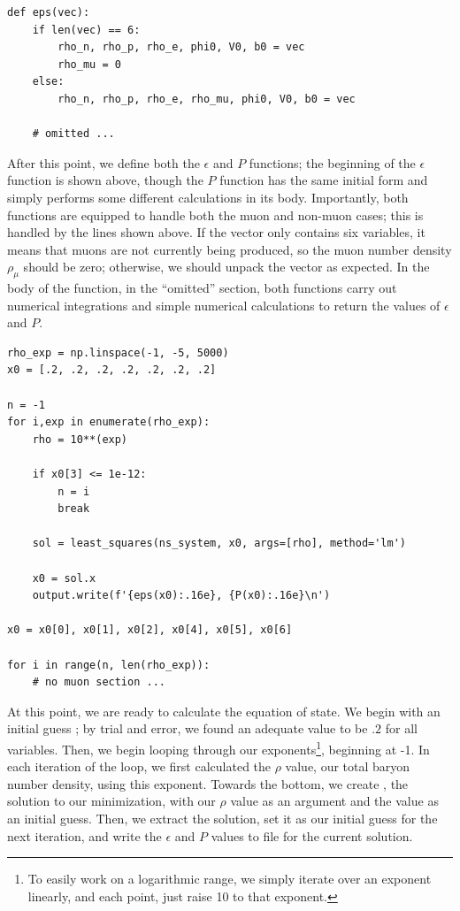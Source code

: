 \begin{lstlisting}
def eps(vec):
    if len(vec) == 6:
        rho_n, rho_p, rho_e, phi0, V0, b0 = vec
        rho_mu = 0
    else:
        rho_n, rho_p, rho_e, rho_mu, phi0, V0, b0 = vec
    
    # omitted ...
\end{lstlisting}

After this point, we define both the $\epsilon$ and $P$ functions; the beginning of the $\epsilon$ function is shown above, though the $P$ function has the same initial form and simply performs some different calculations in its body. Importantly, both functions are equipped to handle both the muon and non-muon cases; this is handled by the lines shown above. If the vector only contains six variables, it means that muons are not currently being produced, so the muon number density $\rho_\mu$ should be zero; otherwise, we should unpack the vector as expected. In the body of the function, in the ``omitted'' section, both functions carry out numerical integrations and simple numerical calculations to return the values of $\epsilon$ and $P$.

\begin{lstlisting}
rho_exp = np.linspace(-1, -5, 5000)
x0 = [.2, .2, .2, .2, .2, .2, .2]

n = -1
for i,exp in enumerate(rho_exp):
    rho = 10**(exp)

    if x0[3] <= 1e-12:
        n = i
        break

    sol = least_squares(ns_system, x0, args=[rho], method='lm')

    x0 = sol.x
    output.write(f'{eps(x0):.16e}, {P(x0):.16e}\n')

x0 = x0[0], x0[1], x0[2], x0[4], x0[5], x0[6]

for i in range(n, len(rho_exp)):
    # no muon section ...
\end{lstlisting}

At this point, we are ready to calculate the equation of state. We begin with an initial guess ; by trial and error, we found an adequate value to be $.2$ for all variables. Then, we begin looping through our exponents\footnote{To easily work on a logarithmic range, we simply iterate over an exponent linearly, and each point, just raise 10 to that exponent.}, beginning at -1. In each iteration of the loop, we first calculated the $\rho$ value, our total baryon number density, using this exponent. Towards the bottom, we create , the solution to our  minimization, with our $\rho$ value as an argument and the  value as an initial guess. Then, we extract the solution, set it as our initial guess for the next iteration, and write the $\epsilon$ and $P$ values to file for the current solution.

